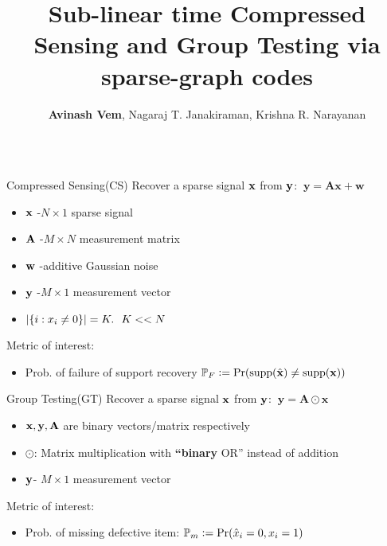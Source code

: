 \documentclass[final]{beamer}
\title{Sub-linear time Compressed Sensing and Group Testing via sparse-graph codes}
\author{\textbf{Avinash Vem}, Nagaraj T. Janakiraman, Krishna R. Narayanan}
\institute{ECE Dept.,Texas A\&M University}
\newlength{\onecolwid}
\newlength{\blockskip}
\newlength{\paraskip}
\newlength{\negativeskip}
\begin{document}
\begin{frame}
\begin{columns}[t]
  \begin{column}{\onecolwid}
\vspace{\negativeskip}
  \begin{block}{\Large Compressed Sensing(CS)}
Recover a sparse signal $\mathbf{x}$ from $\mathbf{y}$:  $~\mathbf{y=Ax +w}$
	 \begin{itemize}
		\item $\mathbf{x}$ -$N \times 1$ sparse signal
		\item $\mathbf{A}$ -$M \times N$ measurement matrix
		\item $\mathbf{w}$ -additive Gaussian noise
		\item $\mathbf{y}$ -$M \times 1$ measurement vector
		\item $\lvert{\{i: x_i\neq 0\}}\rvert=K. ~~ K<<N$
	\end{itemize}
	\vspace{\paraskip}

Metric of interest:
		\begin{itemize}
			\item Prob. of failure of support recovery $\mathbb{P}_{F}\mathrel{\mathop:}= \text{Pr}(\text{supp}(\hat{\mathbf{x}})\neq \text{supp}(\mathbf{x}))$
		\end{itemize}     
    \end{block}
\vspace{\blockskip}    

\begin{block}{\Large Group Testing(GT)}
	Recover a sparse signal $\mathbf{x}$ from $\mathbf{y}$:  $~\mathbf{y=A\odot x}$
	 \begin{itemize}
		\item $\mathbf{x, y, A}$ are binary vectors/matrix respectively
		\item $\odot$: Matrix multiplication with \textbf{``binary} OR'' instead of addition
		\item $\mathbf{y}$- $M \times 1$ measurement vector
	\end{itemize}
	\vspace{\paraskip}
	
Metric of interest:   
    \begin{itemize}
 		\item Prob. of missing defective item: $\mathbb{P}_{m}\mathrel{\mathop:}= \text{Pr}(\hat{x}_i=0, x_i=1)$
	\end{itemize}     
	
 \end{block}


\end{column}
\end{columns}
\end{frame}
\end{document}

